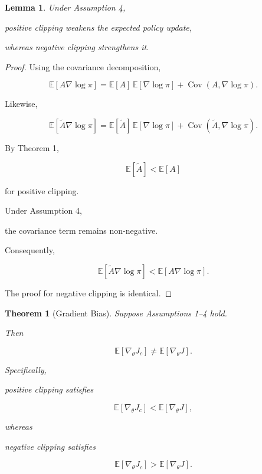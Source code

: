 \documentclass[11pt]{article}
\newtheorem{lemma}{Lemma}
\newtheorem{theorem}{Theorem}
\begin{document}

\begin{lemma}

Under Assumption 4,

positive clipping weakens the expected policy update,

whereas negative clipping strengthens it.

\end{lemma}

\begin{proof}

Using the covariance decomposition,

\[
\mathbb E
[
A\nabla\log\pi
]
=
\mathbb E[A]
\,
\mathbb E[\nabla\log\pi]
+
\operatorname{Cov}
(A,\nabla\log\pi).
\]

Likewise,

\[
\mathbb E
[
\widetilde A\nabla\log\pi
]
=
\mathbb E[\widetilde A]
\,
\mathbb E[\nabla\log\pi]
+
\operatorname{Cov}
(
\widetilde A,
\nabla\log\pi
).
\]

By Theorem 1,

\[
\mathbb E[\widetilde A]
<
\mathbb E[A]
\]

for positive clipping.

Under Assumption 4,

the covariance term remains non-negative.

Consequently,

\[
\mathbb E
[
\widetilde A
\nabla\log\pi
]
<
\mathbb E
[
A
\nabla\log\pi
].
\]

The proof for negative clipping is identical.

\end{proof}


\begin{theorem}[Gradient Bias]

Suppose Assumptions
1--4 hold.

Then

\[
\mathbb E
[
\nabla_\theta J_c
]
\neq
\mathbb E
[
\nabla_\theta J
].
\]

Specifically,

positive clipping satisfies

\[
\mathbb E
[
\nabla_\theta J_c
]
<
\mathbb E
[
\nabla_\theta J
],
\]

whereas

negative clipping satisfies

\[
\mathbb E
[
\nabla_\theta J_c
]
>
\mathbb E
[
\nabla_\theta J
].
\]

\end{theorem}
\end{document}
